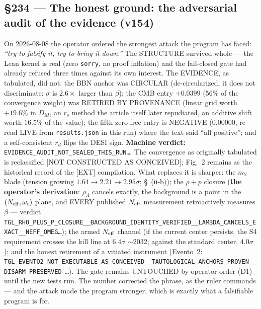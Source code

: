 \documentclass[11pt]{article}
\theoremstyle{definition}\newtheorem{deriv}{Derivation}
\begin{document}
\subsection*{\S234 --- The honest ground: the adversarial audit of the evidence (v154)}On 2026-08-08 the operator ordered the strongest attack the program has faced: \emph{``try to falsify it, try to bring it down.''} The STRUCTURE survived whole --- the Lean kernel is real (zero \texttt{sorry}, no proof inflation) and the fail-closed gate had already refused three times against its own interest. The EVIDENCE, as tabulated, did not: the BBN anchor was CIRCULAR (de-circularized, it does not discriminate: $\sigma$ is $2.6\times$ larger than $\beta$); the CMB entry $+0.0399$ (56\% of the convergence weight) was RETIRED BY PROVENANCE (linear grid worth $+19.6\%$ in $D_M$, an $r_s$ method the article itself later repudiated, an additive shift worth $16.5\%$ of the value); the fifth zero-free entry is NEGATIVE ($0.00000$, re-read LIVE from \texttt{results.json} in this run) where the text said ``all positive''; and a self-consistent $r_d$ flips the DESI sign. \textbf{Machine verdict:} \texttt{EVIDENCE\_AUDIT\_NOT\_SEALED\_THIS\_RUN\ldots}. The convergence as originally tabulated is reclassified [NOT CONSTRUCTED AS CONCEIVED]; Fig.~2 remains as the historical record of the [EXT] compilation. What replaces it is sharper: the $m_2$ blade (tension growing $1.64\to2.21\to2.95\sigma$; \S~(ii-b)); the $\rho{+}p$ closure (\textbf{the operator's derivation}: $\rho_\Lambda$ cancels exactly, the background is a point in the $(N_{\rm eff},\omega_c)$ plane, and EVERY published $N_{\rm eff}$ measurement retroactively measures $\beta$ --- verdict \texttt{TGL\_RHO\_PLUS\_P\_CLOSURE\_\_BACKGROUND\_IDENTITY\_VERIFIED\_\_LAMBDA\_CANCELS\_EXACT\_\_NEFF\_OMEG\ldots}); the armed $N_{\rm eff}$ channel (if the current center persists, the S4 requirement crosses the kill line at $6{.}4\sigma$ $\sim$2032; against the standard center, $4{.}0\sigma$); and the honest retirement of a vitiated instrument (Evento~2: \texttt{TGL\_EVENTO2\_NOT\_EXECUTABLE\_AS\_CONCEIVED\_\_TAUTOLOGICAL\_ANCHORS\_PROVEN\_\_DISARM\_PRESERVED\_\ldots}). The gate remains UNTOUCHED by operator order (D1) until the new tests run. The number corrected the phrase, as the ruler commands --- and the attack made the program stronger, which is exactly what a falsifiable program is for.
\end{document}
